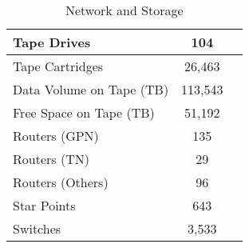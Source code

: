 \begin{table}[H]
    \begin{center}
    \begin{tabular}{|l|c|c}
        \hline
        Tape Drives & 104\\
        \hline
        Tape Cartridges & 26,463\\
        \hline
        Data Volume on Tape (TB) & 113,543\\
        \hline
        Free Space on Tape (TB) & 51,192\\
        \hline
        Routers (GPN) & 135\\
        \hline
        Routers (TN) & 29\\
        \hline
        Routers (Others) & 96\\
        \hline
        Star Points & 643\\
        \hline
        Switches & 3,533\\
        \hline
    \end{tabular}
    \caption[]{Network and Storage}
    \end{center}
\end{table}

